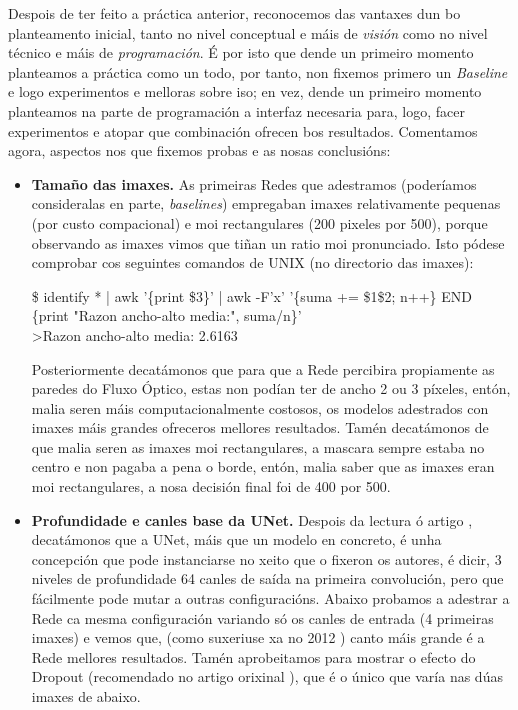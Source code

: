 \documentclass{article}
\begin{document}
Despois de ter feito a práctica anterior, reconocemos das vantaxes dun bo planteamento inicial, tanto no nivel conceptual e máis de \emph{visión} como no nivel técnico e máis de \emph{programación}. É por isto que dende un primeiro momento planteamos a práctica como un todo, por tanto, non fixemos primero un \emph{Baseline} e logo experimentos e melloras sobre iso; en vez, dende un primeiro momento planteamos na parte de programación a interfaz necesaria para, logo, facer experimentos e atopar que combinación ofrecen bos resultados. Comentamos agora, aspectos nos que fixemos probas e as nosas conclusións:

\begin{itemize}
	\item \textbf{Tamaño das imaxes.} As primeiras Redes que adestramos (poderíamos consideralas en parte, \emph{baselines}) empregaban imaxes relativamente pequenas (por custo compacional) e moi rectangulares (200 pixeles por 500), porque observando as imaxes vimos que tiñan un ratio moi pronunciado. Isto pódese comprobar cos seguintes comandos de UNIX (no directorio das imaxes):


\begin{tcolorbox}[colback=gray!10!white, colframe=gray!50!black, 
  boxrule=0.5pt, arc=2pt, left=4pt, right=4pt, top=2pt, bottom=2pt,
  fontupper=\ttfamily\small]
\$ identify * | awk '\{print \$3\}' | awk -F'x' '\{suma += \$1\$2; n++\} END \{print "Razon ancho-alto media:", suma/n\}' \\
\>>Razon ancho-alto media: 2.6163
\end{tcolorbox}

Posteriormente decatámonos que para que a Rede percibira propiamente as paredes do Fluxo Óptico, estas non podían ter de ancho 2 ou 3 píxeles, entón, malia seren máis computacionalmente costosos, os modelos adestrados con imaxes máis grandes ofreceros mellores resultados. Tamén decatámonos de que malia seren as imaxes moi rectangulares, a mascara sempre estaba no centro e non pagaba a pena o borde, entón, malia saber que as imaxes eran moi rectangulares, a  nosa decisión final foi de 400 por 500. 

\item \textbf{Profundidade e canles base da UNet.} Despois da lectura ó artigo \cite{ronneberger2015u}, decatámonos que a UNet, máis que un modelo en concreto, é unha concepción que pode instanciarse no xeito que o fixeron os autores, é dicir, 3 niveles de profundidade 64 canles de saída na primeira convolución, pero que fácilmente pode mutar a outras configuracións. Abaixo probamos a adestrar a Rede ca mesma configuración variando só os canles de entrada (4 primeiras imaxes) e vemos que, (como suxeriuse xa no 2012 \cite{imagenet}) canto máis grande é a Rede mellores resultados. Tamén aprobeitamos para mostrar o efecto do Dropout \cite{srivastava2014dropout} (recomendado no artigo orixinal \cite{ronneberger2015u}), que é o único que varía nas dúas imaxes de abaixo. 


\end{itemize}
\end{document}
